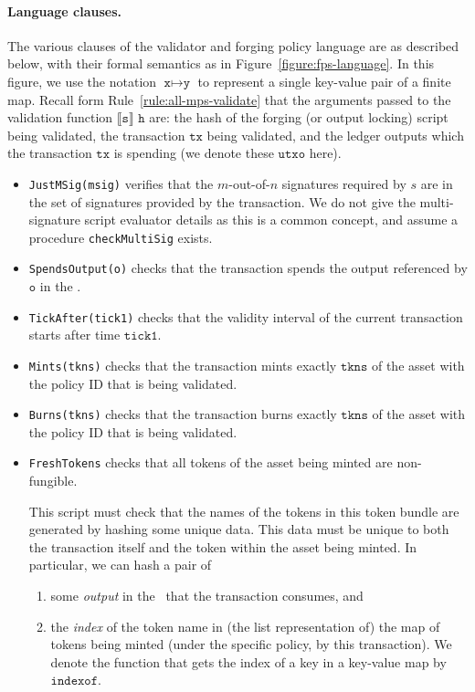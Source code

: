 \paragraph{Language clauses.}
%
The various clauses of the validator and forging policy language are as described below, with their formal semantics as in Figure~\ref{figure:fps-language}. In this figure, we use the notation
$\texttt{x}\mapsto \texttt{y}$ to represent a single key-value pair of a finite map.
Recall form Rule~\ref{rule:all-mps-validate} that the arguments passed to the validation
function $\llbracket \texttt{s} \rrbracket$ $\texttt{h}$ are: the hash of the forging (or output
locking) script being validated, the transaction $\texttt{tx}$ being validated,
and the ledger outputs which the transaction $\texttt{tx}$ is spending (we denote
these $\texttt{utxo}$ here).
%
\begin{itemize}
  \item \texttt{JustMSig(msig)}
  verifies that the $m$-out-of-$n$ signatures required by $s$ are in the
  set of signatures provided by the transaction. We do not give the
  multi-signature script evaluator details as this is a common concept, and
  assume a procedure \texttt{checkMultiSig} exists.

  \item \texttt{SpendsOutput(o)} checks that the transaction spends
  the output referenced by $\texttt{o}$ in the \UTXO.

  \item \texttt{TickAfter(tick1)} checks that the validity interval
  of the current transaction starts after time $\texttt{tick1}$.

  \item \texttt{Mints(tkns)} checks that the transaction mints exactly
  $\texttt{tkns}$ of the asset with the policy ID that is being validated.

  \item \texttt{Burns(tkns)} checks that the transaction burns exactly
  $\texttt{tkns}$ of the asset with the policy ID that is being validated.

  \item \texttt{FreshTokens}
  checks that all tokens of the asset being minted are non-fungible.

  This script must check that the names of the tokens in this token bundle
  are generated by hashing some unique data. This data must be unique to both
  the transaction itself and the token within the asset being minted.
  In particular, we can hash a pair of
  \begin{enumerate}
    \item some \emph{output} in the \UTXO\ that the
    transaction consumes, and
    \item the \emph{index} of the token name in (the
    list representation of) the map of tokens being
    minted (under the specific policy, by this transaction). We denote the
    function that gets the index of a key in a key-value map by $\texttt{indexof}$.
  \end{enumerate}


\end{itemize}
